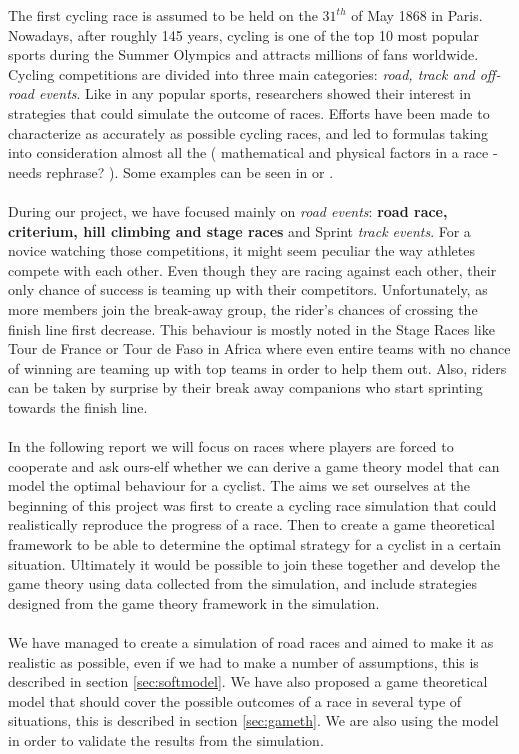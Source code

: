 \documentclass[10pt, a4paper]{report}
\begin{document}
The first cycling race is assumed to be held on the $31^{th}$ of May 1868 in Paris. Nowadays, after roughly 145 years, cycling is one of the top 10 most popular sports during the Summer Olympics \cite{TopEndSportsUrl} and attracts millions of fans worldwide. Cycling competitions are divided into three main categories: \textit{road, track and off-road events}. Like in any popular sports, researchers showed their interest in strategies that could simulate the outcome of races. Efforts have been made to characterize as accurately as possible cycling races, and led to formulas taking into consideration almost all the ( mathematical and physical factors in a race - needs rephrase? ). Some examples can be seen in \cite{AgentModel} or \cite{SlipStream} .
\\\\
During our project, we have focused mainly on \textit{road events}: \textbf{road race, criterium, hill climbing and stage races} and Sprint \textit{track events}. For a novice watching those competitions, it might seem peculiar the way athletes compete with each other. Even though they are racing against each other, their only chance of success is teaming up with their competitors. Unfortunately, as more members join the break-away group, the rider's chances of crossing the finish line first decrease. This behaviour is mostly noted in the Stage Races like Tour de France or Tour de Faso in Africa where even entire teams with no chance of winning are teaming up with top teams in order to help them out. Also, riders can be taken by surprise by their break away companions who start sprinting towards the finish line.
\\\\
In the following report we will focus on races where players are forced to cooperate and ask ours-elf  whether we can derive a game theory model that can model the optimal behaviour for a cyclist. The aims we set ourselves at the beginning of this project was first to create a cycling race simulation that could realistically reproduce the progress of a race. Then to create a game theoretical framework to be able to determine the optimal strategy for a cyclist in a certain situation. Ultimately it would be possible to join these together and develop the game theory using data collected from the simulation, and include strategies designed from the game theory framework in the simulation.
\\\\
We have managed to create a simulation of road races and aimed to make it as realistic as possible, even if we had to make a number of assumptions, this is described in section \ref{sec:softmodel}. We have also proposed a game theoretical model that should cover the possible outcomes of a race in several type of situations, this is described in section \ref{sec:gameth}. We are also using the model in order to validate the results from the simulation.
\end{document}
